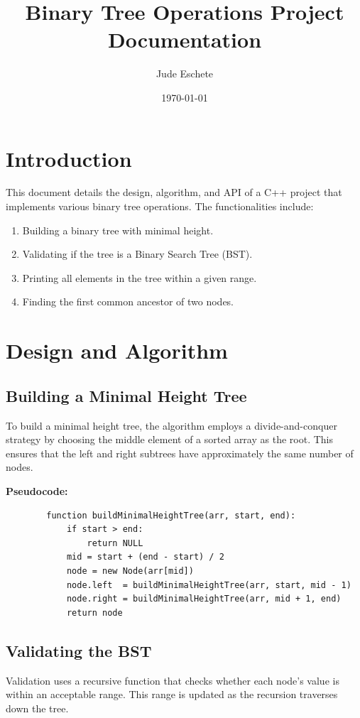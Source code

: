 \documentclass[11pt]{article}
\title{Binary Tree Operations Project Documentation}
\author{Jude Eschete}
\date{\today}
\begin{document}
	
	\maketitle
	
	\section{Introduction}
	This document details the design, algorithm, and API of a C++ project that implements various binary tree operations. The functionalities include:
	\begin{enumerate}
		\item Building a binary tree with minimal height.
		\item Validating if the tree is a Binary Search Tree (BST).
		\item Printing all elements in the tree within a given range.
		\item Finding the first common ancestor of two nodes.
	\end{enumerate}
	
	\section{Design and Algorithm}
	
	\subsection{Building a Minimal Height Tree}
	To build a minimal height tree, the algorithm employs a divide-and-conquer strategy by choosing the middle element of a sorted array as the root. This ensures that the left and right subtrees have approximately the same number of nodes.
	
	\textbf{Pseudocode:}
	\begin{verbatim}
		function buildMinimalHeightTree(arr, start, end):
			if start > end:
				return NULL
			mid = start + (end - start) / 2
			node = new Node(arr[mid])
			node.left  = buildMinimalHeightTree(arr, start, mid - 1)
			node.right = buildMinimalHeightTree(arr, mid + 1, end)
			return node
	\end{verbatim}
	
	\subsection{Validating the BST}
	Validation uses a recursive function that checks whether each node's value is within an acceptable range. This range is updated as the recursion traverses down the tree.
	
\end{document}
